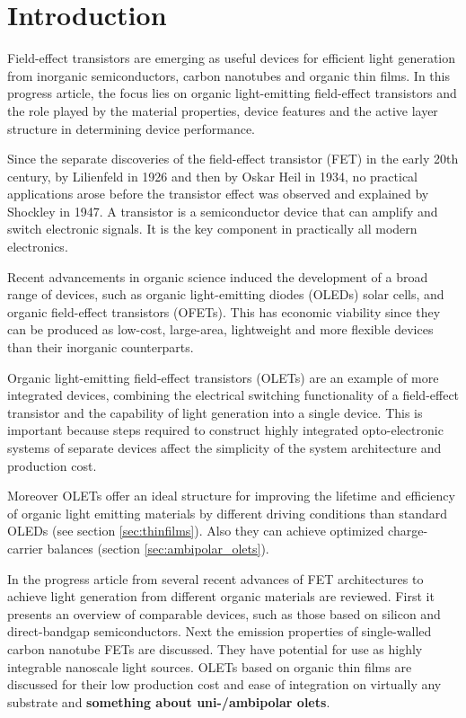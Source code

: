 \section{Introduction}
Field-effect transistors are emerging as useful devices for efficient light generation from inorganic semiconductors, carbon nanotubes and organic thin films. In this progress article, the focus lies on organic light-emitting field-effect transistors and the role played by the material properties, device features and the active layer structure in determining device performance.

Since the separate discoveries of the field-effect transistor (FET) in the early 20th century, by Lilienfeld in 1926 and then by Oskar Heil in 1934, no practical applications arose before the transistor effect was observed and explained by Shockley in 1947. A transistor is a semiconductor device that can amplify and switch electronic signals. It is the key component in practically all modern electronics.

Recent advancements in organic science induced the development of a broad range of devices, such as organic light-emitting diodes (OLEDs) solar cells, and organic field-effect transistors (OFETs). This has economic viability since they can be produced as low-cost, large-area, lightweight and more flexible devices than their inorganic counterparts.

Organic light-emitting field-effect transistors (OLETs) are an example of more integrated devices, combining the electrical switching functionality of a field-effect transistor and the capability of light generation into a single device. This is important because steps required to construct highly integrated opto-electronic systems of separate devices affect the simplicity of the system architecture and production cost.

Moreover OLETs offer an ideal structure for improving the lifetime and efficiency of organic light emitting materials by different driving conditions than standard OLEDs (see section \ref{sec:thinfilms}). Also they can achieve optimized charge-carrier balances (section \ref{sec:ambipolar_olets}).

In the progress article from \citet{Muccini} several recent advances of FET architectures to achieve light generation from different organic materials are reviewed. First it presents an overview of comparable devices, such as those based on silicon and direct-bandgap semiconductors. Next the emission properties of single-walled carbon nanotube FETs are discussed. They have potential for use as highly integrable nanoscale light sources. OLETs based on organic thin films are discussed for their low production cost and ease of integration on virtually any substrate and \textbf{something about uni-/ambipolar olets}.
